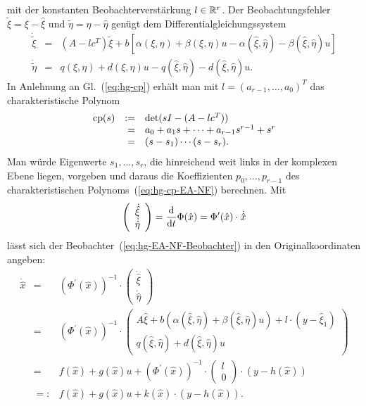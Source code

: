 mit der konstanten Beobachterverstärkung $l\in{\mathbb{R}}^{r}$. Der Beobachtungsfehler
$\tilde{\xi}=\xi-\hat{\xi}$ und $\tilde{\eta}=\eta-\hat{\eta}$ genügt
dem Differentialgleichungssystem
\begin{equation}
\begin{array}{lcl}
\dot{\tilde{\xi}} & = & \left(A-lc^{T}\right)\tilde{\xi}+b\left[\alpha(\xi,\eta)+\beta(\xi,\eta)u-\alpha(\hat{\xi},\hat{\eta})-\beta(\hat{\xi},\hat{\eta})u\right]\\
\dot{\tilde{\eta}} & = & q(\xi,\eta)+d(\xi,\eta)u-q(\hat{\xi},\hat{\eta})-d(\hat{\xi},\hat{\eta})u.
\end{array}\label{eq:hg-EA-fehler-dgl}
\end{equation}
In Anlehnung an Gl.~(\ref{eq:hg-cp}) erhält man mit $l=(a_{r-1},\ldots,a_{0})^{T}$
das charakteristische Polynom 
\begin{equation}
\begin{array}{crl}
{\operatorname{cp}}(s) & := & \det(sI-(A-lc^{T}))\\
 & = & a_{0}+a_{1}s+\cdots+a_{r-1}s^{r-1}+s^{r}\\
 & = & (s-s_{1})\cdots(s-s_{r}).
\end{array}\label{eq:hg-cp-EA-NF}
\end{equation}
Man würde Eigenwerte $s_{1},\ldots,s_{r}$, die hinreichend weit links
in der komplexen Ebene liegen, vorgeben und daraus die Koeffizienten
$p_{0},\ldots,p_{r-1}$ des charakteristischen Polynoms~(\ref{eq:hg-cp-EA-NF})
berechnen. Mit 
\[
\left(\begin{array}{c}
\dot{\hat{\xi}}\\
\dot{\hat{\eta}}
\end{array}\right)=\frac{{\mathrm{d}}}{{\mathrm{d}} t}\Phi(\hat{x})=\Phi^{\prime}(\hat{x})\cdot\dot{\hat{x}}
\]
lässt sich der Beobachter~(\ref{eq:hg-EA-NF-Beobachter}) in den
Originalkoordinaten angeben:
\begin{equation}
\begin{array}{lll}
\dot{\hat{x}} & = & \left(\Phi^{\prime}(\hat{x})\right)^{-1}\cdot\left(\begin{array}{c}
\dot{\hat{\xi}}\\
\dot{\hat{\eta}}
\end{array}\right)\\
 & = & \left(\Phi^{\prime}(\hat{x})\right)^{-1}\cdot\left(\begin{array}{c}
A\hat{\xi}+b(\alpha(\hat{\xi},\hat{\eta})+\beta(\hat{\xi},\hat{\eta})u)+l\cdot(y-\hat{\xi}_{1})\\
q(\hat{\xi},\hat{\eta})+d(\hat{\xi},\hat{\eta})u
\end{array}\right)\\
 & = & f(\hat{x})+g(\hat{x})u+\left(\Phi^{\prime}(\hat{x})\right)^{-1}\cdot\left(\begin{array}{c}
l\\
0
\end{array}\right)\cdot(y-h(\hat{x}))\\
 & =: & f(\hat{x})+g(\hat{x})u+k(\hat{x})\cdot(y-h(\hat{x})).
\end{array}\label{eq:hg-EA-Beobachter-x}
\end{equation}
